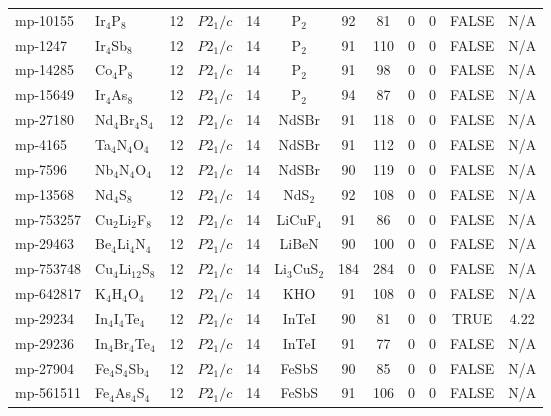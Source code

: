 {\begin{longtable}{llcccccccccc}
    mp-10155 & Ir$_{4}$P$_{8}$ & 12    & $P2_1/c$ & 14    & P$_{2}$ & 92    & 81    & 0     & 0     & FALSE & N/A \\
    mp-1247 & Ir$_{4}$Sb$_{8}$ & 12    & $P2_1/c$ & 14    & P$_{2}$ & 91    & 110   & 0     & 0     & FALSE & N/A \\
    mp-14285 & Co$_{4}$P$_{8}$ & 12    & $P2_1/c$ & 14    & P$_{2}$ & 91    & 98    & 0     & 0     & FALSE & N/A \\
    mp-15649 & Ir$_{4}$As$_{8}$ & 12    & $P2_1/c$ & 14    & P$_{2}$ & 94    & 87    & 0     & 0     & FALSE & N/A \\
    mp-27180 & Nd$_{4}$Br$_{4}$S$_{4}$ & 12    & $P2_1/c$ & 14    & NdSBr & 91    & 118   & 0     & 0     & FALSE & N/A \\
    mp-4165 & Ta$_{4}$N$_{4}$O$_{4}$ & 12    & $P2_1/c$ & 14    & NdSBr & 91    & 112   & 0     & 0     & FALSE & N/A \\
    mp-7596 & Nb$_{4}$N$_{4}$O$_{4}$ & 12    & $P2_1/c$ & 14    & NdSBr & 90    & 119   & 0     & 0     & FALSE & N/A \\
    mp-13568 & Nd$_{4}$S$_{8}$ & 12    & $P2_1/c$ & 14    & NdS$_{2}$ & 92    & 108   & 0     & 0     & FALSE & N/A \\
    mp-753257 & Cu$_{2}$Li$_{2}$F$_{8}$ & 12    & $P2_1/c$ & 14    & LiCuF$_{4}$ & 91    & 86    & 0     & 0     & FALSE & N/A \\
    mp-29463 & Be$_{4}$Li$_{4}$N$_{4}$ & 12    & $P2_1/c$ & 14    & LiBeN & 90    & 100   & 0     & 0     & FALSE & N/A \\
    mp-753748 & Cu$_{4}$Li$_{12}$S$_{8}$ & 12    & $P2_1/c$ & 14    & Li$_{3}$CuS$_{2}$ & 184   & 284   & 0     & 0     & FALSE & N/A \\
    mp-642817 & K$_{4}$H$_{4}$O$_{4}$ & 12    & $P2_1/c$ & 14    & KHO   & 91    & 108   & 0     & 0     & FALSE & N/A \\
    mp-29234 & In$_{4}$I$_{4}$Te$_{4}$ & 12    & $P2_1/c$ & 14    & InTeI & 90    & 81    & 0     & 0     & TRUE  & 4.22  \\
    mp-29236 & In$_{4}$Br$_{4}$Te$_{4}$ & 12    & $P2_1/c$ & 14    & InTeI & 91    & 77    & 0     & 0     & FALSE & N/A \\
    mp-27904 & Fe$_{4}$S$_{4}$Sb$_{4}$ & 12    & $P2_1/c$ & 14    & FeSbS & 90    & 85    & 0     & 0     & FALSE & N/A \\
    mp-561511 & Fe$_{4}$As$_{4}$S$_{4}$ & 12    & $P2_1/c$ & 14    & FeSbS & 91    & 106   & 0     & 0     & FALSE & N/A \\

\end{longtable}}
